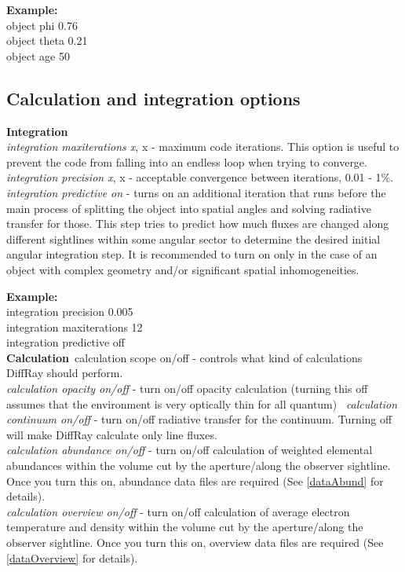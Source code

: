 \documentclass[a4paper]{article}
\begin{document}
    {\bf Example:}\\
object phi 0.76\\
object theta 0.21\\
object age 50\\

\subsection{Calculation and integration options}
{\bf Integration}\\
    {\it integration maxiterations x}, x - maximum code iterations.
This option is useful to prevent the code from falling into an endless loop when trying to converge.\\
    {\it integration precision x}, x - acceptable convergence between iterations, 0.01 - 1\%. \\
    {\it integration predictive on} - turns on an additional iteration that runs before the main process of splitting the object into spatial angles and solving
radiative transfer for those.
This step tries to predict how much fluxes are changed along different sightlines within some angular sector
to determine the desired initial angular integration step.
It is recommended to turn on only in the case of an object with complex geometry and/or
significant spatial inhomogeneities.

{\bf Example:}\\
integration precision 0.005\\
integration maxiterations 12\\
integration predictive off\\

{\bf Calculation}\
calculation {scope} on/off - controls what kind of calculations DiffRay should perform. \\
    {\it calculation opacity on/off} - turn on/off opacity calculation (turning this off assumes that the environment is very optically thin for all
quantum) \
    {\it calculation continuum on/off} - turn on/off radiative transfer for the continuum. Turning off will make DiffRay calculate only line fluxes. \\
    {\it calculation abundance on/off} - turn on/off calculation of weighted elemental abundances within the volume cut by the aperture/along the observer sightline. Once you turn this on,
abundance data files are required (See \ref{dataAbund} for details). \\
    {\it calculation overview on/off} - turn on/off calculation of average electron temperature and density within the volume cut by the aperture/along the observer sightline. Once you turn this on,
overview data files are required (See \ref{dataOverview} for details). \\
\end{document}
